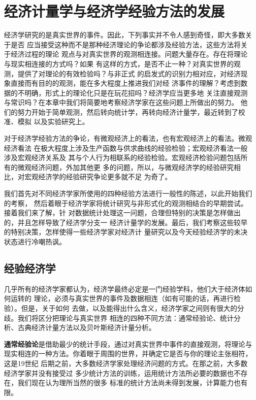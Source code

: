 \chapter{经济计量学与经济学经验方法的发展}

经济学研究的是真实世界的事件。因此，下列事实并不令人感到奇怪，即大多数关于是否
应当接受这种而不是那种经济理论的争论都涉及经验方法，这些方法将关于经济过程的理论
观点与对真实世界的观测相连接。问题大量存在。存在将理论与现实相连接的方式吗？如果
有这样的方式，是否不止一种？对真实世界的观测，提供了对理论的有效检验吗？与非正式
的启发式的识别力相对应，对经济现象直接而有目的的观测，能在多大程度上推进我们对经
济事件的理解？考虑到数据的不明确，形式上的理论化只是在玩花招吗？经济学应当更多地
关注直接观测与常识吗？在本章中我们将简要地考察经济学家在这些问题上所做出的努力。
他们的努力开始于简单观测，然后转向统计学，再转向经济计量学，最近转到了校准、模拟
以及实验研究上。

对于经济学经验方法的争论，有微观经济上的看法，也有宏观经济上的看法。微观经济看法
在极大程度上涉及生产函数与供求曲线的经验检验；宏观经济看法一般涉及宏观经济关系及
其与个人行为相联系的经验检验。宏观经济检验问题包括所有的微观经济问题，外加其他更
多的问题，所以，与微观经济学的经验研究相比，对宏观经济学的经验研究争论更多就不足
为奇了。

我们首先对不同经济学家所使用的四种经验方法进行一般性的陈述，以此开始我们的考察，
然后着眼于经济学家将统计研究与非形式化的观测相结合的早期尝试。接着我们来了解，针
对数据统计处理这一问题，合理但特别的决策是怎样做出的，并且怎样导致了经济学分支一
经济计量学的发展。最后，我们考察这些较早的特别决策，怎样使得一些经济学家对经济计
量研究以及今天经验经济学的未决状态进行冷嘲热讽。

\section{经验经济学}

几乎所有的经济学家都认为，经济学最终必定是一门经验学科，他们大于经济体如何运转的
理论，必须与真实世界的事件及数据相连（如有可能的话，再进行检验）。但是，关于如何
去做，以及能得出什么含义，经济学家之间则有很大的分歧。我们将区分把理论与真实世界
相连的四种不同方法：通常经验论、统计分析、古典经济计量方法以及贝叶斯经济计量分析。

\textbf{通常经验论}是借助最少的统计手段，通过对真实世界中事件的直接观测，将理论与
现实相连的一种方法。你着眼于周围的世界，并确定它是否与你的理论主张相符，这是19世纪
后期之前，大多数经济学家处理经济问题的方式。在那之前，大多数经济学家并没有接受过
多少统计方法的训练，运用统计方法所必要的数据也不存在，我们现在认为理所当然的很多
标准的统计方法尚未得到发展，计算能力也有限。

